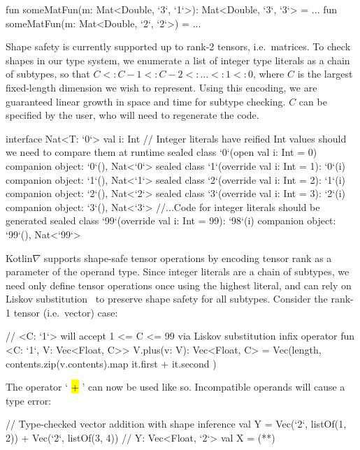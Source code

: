 \documentclass[12pt,initial,twoside,maitrise]{dms}
\makeatletter
\def\uwave{\bgroup \markoverwith{\lower3.5\p@\hbox{\sixly \textcolor{red}{\char58}}}\ULon}
\newcommand{\inline}[1]{%
\begingroup%
\sethlcolor{slightgray}%
\hl{\ttfamily\small #1}%
\endgroup
}
\numberwithin{equation}{section}
\numberwithin{table}{chapter}
\numberwithin{figure}{chapter}
\makeatother
\begin{document}
%
\begin{kotlinlisting}
fun someMatFun(m: Mat<Double, `3`, `1`>): Mat<Double, `3`, `3`> = ...
fun someMatFun(m: Mat<Double, `2`, `2`>) = ...
\end{kotlinlisting}
%
Shape safety is currently supported up to rank-2 tensors, i.e.\ matrices. To check shapes in our type system, we enumerate a list of integer type literals as a chain of subtypes, so that $C <: C - 1 <: C - 2 <: \dots <: 1 <: 0$, where $C$ is the largest fixed-length dimension we wish to represent. Using this encoding, we are guaranteed linear growth in space and time for subtype checking. $C$ can be specified by the user, who will need to regenerate the code.
%
\begin{kotlinlisting}[caption={Shape safe tensor addition for rank-1 tensors, $\forall C\leq2.$}]
interface Nat<T: `0`> { val i: Int }
// Integer literals have reified Int values should we need to compare them at runtime
sealed class `0`(open val i: Int = 0) { companion object: `0`(), Nat<`0`> }
sealed class `1`(override val i: Int = 1): `0`(i) { companion object: `1`(), Nat<`1`> }
sealed class `2`(override val i: Int = 2): `1`(i) { companion object: `2`(), Nat<`2`> }
sealed class `3`(override val i: Int = 3): `2`(i) { companion object: `3`(), Nat<`3`> }
//...Code for integer literals should be generated
sealed class `99`(override val i: Int = 99): `98`(i) { companion object: `99`(), Nat<`99`> }
\end{kotlinlisting}
%
Kotlin$\nabla$ supports shape-safe tensor operations by encoding tensor rank as a parameter of the operand type. Since integer literals are a chain of subtypes, we need only define tensor operations once using the highest literal, and can rely on Liskov substitution~\citep{liskov1987} to preserve shape safety for all subtypes. Consider the rank-1 tensor (i.e.\ vector) case:
%
\begin{kotlinlisting}
// <C: `1`> will accept 1 <= C <= 99 via Liskov substitution
infix operator fun <C: `1`, V: Vec<Float, C>> V.plus(v: V): Vec<Float, C> =
    Vec(length, contents.zip(v.contents).map { it.first + it.second })
\end{kotlinlisting}
%
The operator `\inline{+}' can now be used like so. Incompatible operands will cause a type error:
%
\begin{kotlinlisting}
// Type-checked vector addition with shape inference
val Y = Vec(`2`, listOf(1, 2)) + Vec(`2`, listOf(3, 4)) // Y: Vec<Float, `2`>
val X = (*\uwave{Vec(`2`, listOf(1, 2)) + Vec(`5`, listOf(3, 4, 1, 2, 4))}*)
\end{kotlinlisting}
\end{document}
